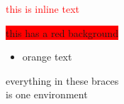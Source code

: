 \documentclass[a4paper, 12pt]{article}
\begin{document}
\textcolor{red}{this is inline text}

\colorbox{red}{this has a red background}

\begin{itemize}
\color{orange}
	\item orange text
\end{itemize}

{ \color{Rhodamine} everything in these braces\\ is one environment}
\end{document}
